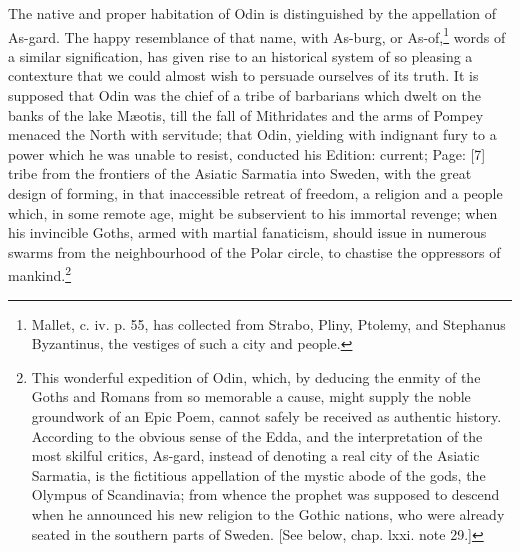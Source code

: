 The native and proper habitation of Odin is distinguished by the appellation of As-gard. The happy resemblance of that name, with As-burg, or As-of,\footnote{Mallet, c. iv. p. 55, has collected from Strabo, Pliny, Ptolemy, and Stephanus Byzantinus, the vestiges of such a city and people.} words of a similar signification, has given rise to an historical system of so pleasing a contexture that we could almost wish to persuade ourselves of its truth. It is supposed that Odin was the chief of a tribe of barbarians which dwelt on the banks of the lake Mæotis, till the fall of Mithridates and the arms of Pompey menaced the North with servitude; that Odin, yielding with indignant fury to a power which he was unable to resist, conducted his Edition: current; Page: [7] tribe from the frontiers of the Asiatic Sarmatia into Sweden, with the great design of forming, in that inaccessible retreat of freedom, a religion and a people which, in some remote age, might be subservient to his immortal revenge; when his invincible Goths, armed with martial fanaticism, should issue in numerous swarms from the neighbourhood of the Polar circle, to chastise the oppressors of mankind.\footnote{This wonderful expedition of Odin, which, by deducing the enmity of the Goths and Romans from so memorable a cause, might supply the noble groundwork of an Epic Poem, cannot safely be received as authentic history. According to the obvious sense of the Edda, and the interpretation of the most skilful critics, As-gard, instead of denoting a real city of the Asiatic Sarmatia, is the fictitious appellation of the mystic abode of the gods, the Olympus of Scandinavia; from whence the prophet was supposed to descend when he announced his new religion to the Gothic nations, who were already seated in the southern parts of Sweden. [See below, chap. lxxi. note 29.]}


